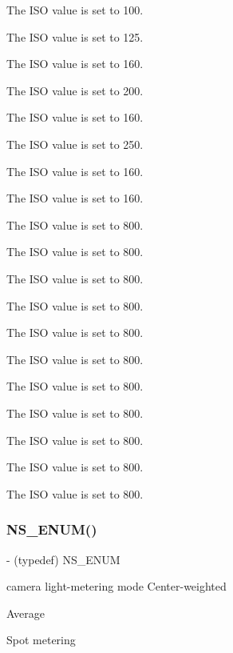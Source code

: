 The I\+SO value is set to 100.

The I\+SO value is set to 125.

The I\+SO value is set to 160.

The I\+SO value is set to 200.

The I\+SO value is set to 160.

The I\+SO value is set to 250.

The I\+SO value is set to 160.

The I\+SO value is set to 160.

The I\+SO value is set to 800.

The I\+SO value is set to 800.

The I\+SO value is set to 800.

The I\+SO value is set to 800.

The I\+SO value is set to 800.

The I\+SO value is set to 800.

The I\+SO value is set to 800.

The I\+SO value is set to 800.

The I\+SO value is set to 800.

The I\+SO value is set to 800.

The I\+SO value is set to 800.\mbox{\label{interface_p_v_camera_settings_def_a35c0aa51540db13377278fbadfab8d74}} 
\subsubsection{\texorpdfstring{N\+S\+\_\+\+E\+N\+U\+M()}{NS\_ENUM()}\hspace{0.1cm}{\footnotesize\ttfamily [15/17]}}
{\footnotesize\ttfamily -\/ (typedef) N\+S\+\_\+\+E\+N\+UM \begin{DoxyParamCaption}\item[{(N\+S\+U\+Integer)}]{ }\item[{(P\+V\+Eye\+Camera\+Metering\+Mode)}]{ }\end{DoxyParamCaption}}

camera light-\/metering mode Center-\/weighted

Average

Spot metering\mbox{\label{interface_p_v_camera_settings_def_a5cebcfb5e1d577fe2f1df6a3e4f8a780}} 
